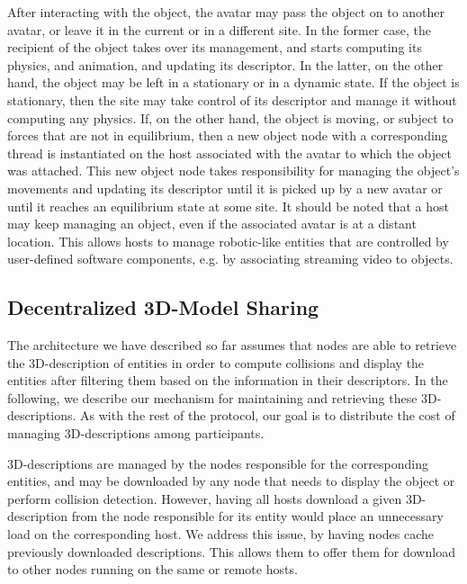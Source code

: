 After interacting with the object, the avatar may pass the object on
to another avatar, or leave it in the current or in a different
site. In the former case, the recipient of the object takes over its
management, and starts computing its physics, and animation, and
updating its descriptor.  In the latter, on the other hand, the object
may be left in a stationary or in a dynamic state. If the object is
stationary, then the site may take control of its descriptor and
manage it without computing any physics. If, on the other hand, the
object is moving, or subject to forces that are not in equilibrium,
then a new object node with a corresponding thread is instantiated on
the host associated with the avatar to which the object was
attached. This new object node takes responsibility for managing the
object's movements and updating its descriptor until it is picked up
by a new avatar or until it reaches an equilibrium state at some site.
It should be noted that a host may keep managing an object, even if
the associated avatar is at a distant location. This allows hosts to
manage robotic-like entities that are controlled by user-defined
software components, e.g. by associating streaming video to
objects.

\subsection{Decentralized 3D-Model Sharing}
\label{sec:decentr-3d-models}
The architecture we have described so far assumes that nodes are able
to retrieve the 3D-description of entities in order to compute
collisions and display the entities after filtering them based on the
information in their descriptors. In the following, we describe our
mechanism for maintaining and retrieving these 3D-descriptions. As
with the rest of the protocol, our goal is to distribute the cost of
managing 3D-descriptions among \sol participants.



3D-descriptions are managed by the nodes responsible for the
corresponding entities, and may be downloaded by any node that needs
to display the object or perform collision detection. However, having
all hosts download a given 3D-description from the node responsible
for its entity would place an unnecessary load on the corresponding
host. We address this issue, by having \sol nodes cache previously
downloaded descriptions. This allows them to offer them for download
to other \sol nodes running on the same or remote hosts.

